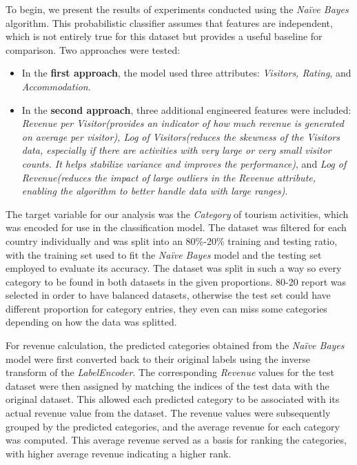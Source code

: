\documentclass{article}
\begin{document}
To begin, we present the results of experiments conducted using the \textit{Na\"{i}ve Bayes} algorithm. This probabilistic classifier assumes that features are independent, which is not entirely true for this dataset but provides a useful baseline for comparison. Two approaches were tested:
\begin{itemize}
    \item In the \textbf{first approach}, the model used three attributes: \textit{Visitors, Rating}, and \textit{Accommodation}.
    \item In the \textbf{second approach}, three additional engineered features were included: \textit{Revenue per Visitor(provides an indicator of how much revenue is generated on average per visitor), Log of Visitors(reduces the skewness of the Visitors data, especially if there are activities with very large or very small visitor counts. It helps stabilize variance and improves the performance)}, and \textit{Log of Revenue(reduces the impact of large outliers in the Revenue attribute, enabling the algorithm to better handle data with large ranges)}.
\end{itemize}

The target variable for our analysis was the \textit{Category} of tourism activities, which was encoded for use in the classification model. The dataset was filtered for each country individually and  was split into an 80\%-20\% training and testing ratio, with the training set used to fit the \textit{Na\"{i}ve Bayes} model and the testing set employed to evaluate its accuracy. The dataset was split in such a way so every category to be found in both datasets in the given proportions. 80-20 report was selected in order to have balanced datasets, otherwise the test set could have different proportion for category entries, they even can miss some categories depending on how the data was splitted.

For revenue calculation, the predicted categories obtained from the \textit{Na\"{i}ve Bayes} model were first converted back to their original labels using the inverse transform of the \textit{LabelEncoder}. The corresponding \textit{Revenue} values for the test dataset were then assigned by matching the indices of the test data with the original dataset. This allowed each predicted category to be associated with its actual revenue value from the dataset. The revenue values were subsequently grouped by the predicted categories, and the average revenue for each category was computed. This average revenue served as a basis for ranking the categories, with higher average revenue indicating a higher rank.
\end{document}
